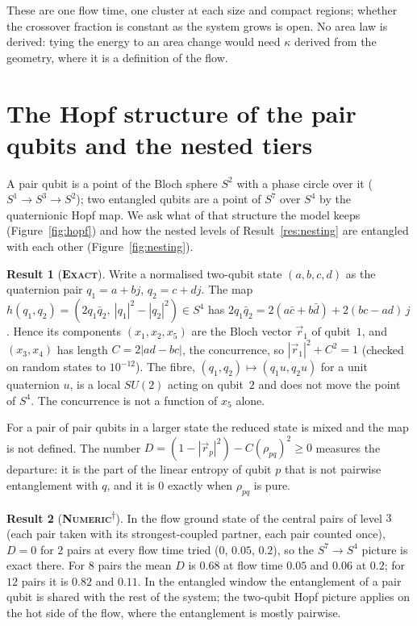 \documentclass[11pt]{article}
\newcommand{\exact}{\textbf{\textsc{Exact}}}
\newcommand{\numeric}{\textbf{\textsc{Numeric}}}
\newcommand{\snap}{\textsuperscript{$\dagger$}}      %
\theoremstyle{definition}
\newtheorem{result}{Result}
\begin{document}
These are one flow time, one cluster at each size and compact regions; whether the crossover fraction is constant as the system grows is open. No area law is derived: tying the energy to an area change would need $\kappa$ derived from the geometry, where it is a definition of the flow.

\section{The Hopf structure of the pair qubits and the nested tiers}\label{sec:hopf}
A pair qubit is a point of the Bloch sphere $S^2$ with a phase circle over it ($S^1\to S^3\to S^2$); two entangled qubits are a point of $S^7$ over $S^4$ by the quaternionic Hopf map. We ask what of that structure the model keeps (Figure~\ref{fig:hopf}) and how the nested levels of Result~\ref{res:nesting} are entangled with each other (Figure~\ref{fig:nesting}).
\begin{result}[\exact]\label{res:hopf-s4}
Write a normalised two-qubit state $(a,b,c,d)$ as the quaternion pair $q_1=a+bj$, $q_2=c+dj$. The map $h(q_1,q_2)=(2q_1\bar q_2,\ |q_1|^2-|q_2|^2)\in S^4$ has $2q_1\bar q_2=2(a\bar c+b\bar d)+2(bc-ad)\,j$. Hence its components $(x_1,x_2,x_5)$ are the Bloch vector $\vec r_1$ of qubit~$1$, and $(x_3,x_4)$ has length $C=2|ad-bc|$, the concurrence, so $|\vec r_1|^2+C^2=1$ (checked on random states to $10^{-12}$). The fibre, $(q_1,q_2)\mapsto(q_1u,q_2u)$ for a unit quaternion $u$, is a local $SU(2)$ acting on qubit~$2$ and does not move the point of $S^4$. The concurrence is not a function of $x_5$ alone.
\end{result}
For a pair of pair qubits in a larger state the reduced state is mixed and the map is not defined. The number $D=(1-|\vec r_p|^2)-C(\rho_{pq})^2\ge0$ measures the departure: it is the part of the linear entropy of qubit $p$ that is not pairwise entanglement with $q$, and it is $0$ exactly when $\rho_{pq}$ is pure.
\begin{result}[\numeric\snap]\label{res:hopf-leak}
In the flow ground state of the central pairs of level $3$ (each pair taken with its strongest-coupled partner, each pair counted once), $D=0$ for $2$ pairs at every flow time tried ($0$, $0.05$, $0.2$), so the $S^7\to S^4$ picture is exact there. For $8$ pairs the mean $D$ is $0.68$ at flow time $0.05$ and $0.06$ at $0.2$; for $12$ pairs it is $0.82$ and $0.11$. In the entangled window the entanglement of a pair qubit is shared with the rest of the system; the two-qubit Hopf picture applies on the hot side of the flow, where the entanglement is mostly pairwise.
\end{result}
\end{document}
